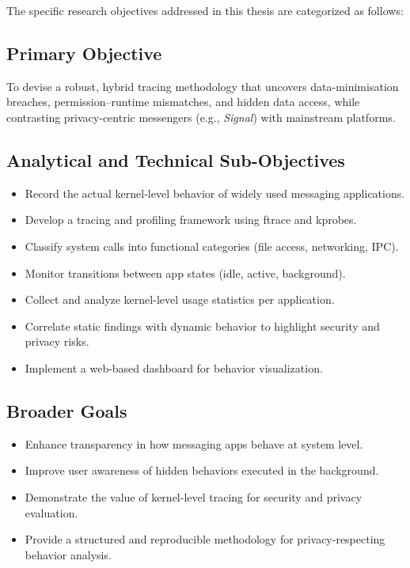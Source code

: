 \documentclass[a4paper,12pt]{report}
\begin{document}
The specific research objectives addressed in this thesis are categorized as follows:

\subsection*{Primary Objective}

To devise a robust, hybrid tracing methodology that uncovers data-minimisation breaches, permission–runtime mismatches, and hidden data access, while contrasting privacy-centric messengers (e.g., \textit{Signal}) with mainstream platforms.

\subsection*{Analytical and Technical Sub-Objectives}
\begin{itemize}
\item Record the actual kernel-level behavior of widely used messaging applications.
\item Develop a tracing and profiling framework using ftrace and kprobes.
\item Classify system calls into functional categories (file access, networking, IPC).
\item Monitor transitions between app states (idle, active, background).
\item Collect and analyze kernel-level usage statistics per application.
\item Correlate static findings with dynamic behavior to highlight security and privacy risks.
\item Implement a web-based dashboard for behavior visualization.
\end{itemize}

\subsection*{Broader Goals}
\begin{itemize}
\item Enhance transparency in how messaging apps behave at system level.
\item Improve user awareness of hidden behaviors executed in the background.
\item Demonstrate the value of kernel-level tracing for security and privacy evaluation.
\item Provide a structured and reproducible methodology for privacy-respecting
behavior analysis.
\end{itemize}
\end{document}
